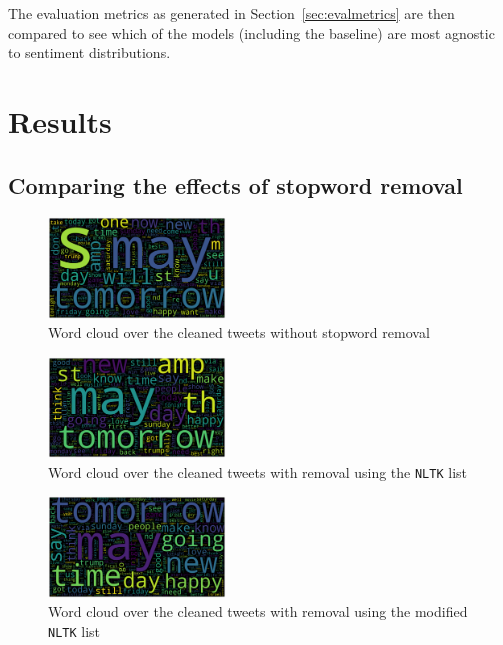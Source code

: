 \documentclass[11pt]{article}
\begin{document}
The evaluation metrics as generated in Section~\ref{sec:evalmetrics} are then compared to see which of the models 
(including the baseline) are most agnostic to sentiment distributions.

\section{Results}\label{sec:results}

\subsection{Comparing the effects of stopword removal}

\begin{figure}[!h]
	\centering
	\includegraphics[width = 0.42\textwidth]{wc/text-clean-no-stopwords.png}
	\caption{Word cloud over the cleaned tweets without stopword removal}
	\label{fig:wc-nosw}
\end{figure} 

\begin{figure}[!h]
	\centering
	\includegraphics[width = 0.42\textwidth]{wc/all-clean-nltk.png}
	\caption{Word cloud over the cleaned tweets with removal using the \texttt{NLTK} list}
	\label{fig:wc-nltk}
\end{figure} 

\begin{figure}[!h]
	\centering
	\includegraphics[width = 0.42\textwidth]{wc/all-clean-final.png}
	\caption{Word cloud over the cleaned tweets with removal using the modified \texttt{NLTK} list}
	\label{fig:wc-final}
\end{figure} 
\end{document}
